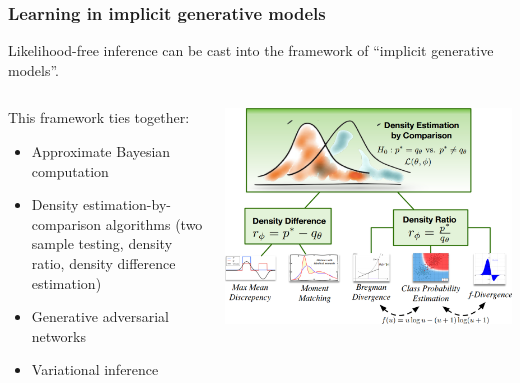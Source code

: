 \documentclass{beamer}
\begin{document}
\begin{frame}
    \frametitle{Learning in implicit generative models}

    Likelihood-free inference can be cast into the framework of ``implicit generative models''.

    \begin{columns}
        \begin{column}{0.35\textwidth}
            {\scriptsize
            This framework ties together:
            \begin{itemize}
                \item Approximate Bayesian computation
                \item Density estimation-by-comparison algorithms (two sample testing, density ratio, density difference estimation)
                \item Generative adversarial networks
                \item Variational inference
            \end{itemize}}
        \end{column}
        \begin{column}{0.65\textwidth}
            \begin{center}
                \includegraphics[width=\textwidth]{figures/implicit.png}
            \end{center}
        \end{column}
    \end{columns}

\end{frame}
\end{document}
